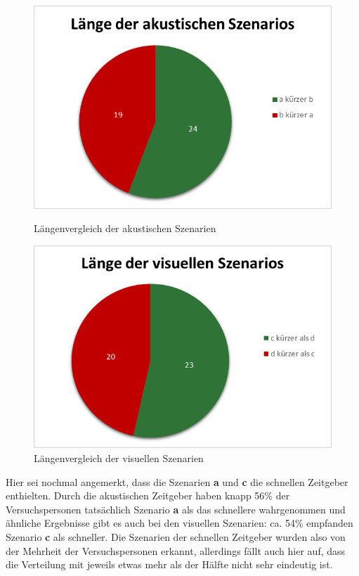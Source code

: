 \documentclass{Paper}
\begin{document}
\begin{figure}[H]
\begin{minipage}[t]{0.49\linewidth}
	\includegraphics[scale=0.7]{../Diagramme/einschaetzung/laenge_akustisch.png}
	\caption{Längenvergleich der akustischen Szenarien}
	\label{SzenarienAkustisch}
\end{minipage}
\hfill
\begin{minipage}[t]{0.49\linewidth}
	\includegraphics[scale=0.45]{../Diagramme/einschaetzung/laenge_visuell.png}
	\caption{Längenvergleich der visuellen Szenarien}
	\label{SzenarienVisuell}
\end{minipage}
\end{figure}

       
Hier sei nochmal angemerkt, dass die Szenarien \textbf{a} und \textbf{c} die schnellen Zeitgeber enthielten. Durch die akustischen Zeitgeber haben knapp 56\% der Versuchspersonen tatsächlich Szenario \textbf{a} als das schnellere wahrgenommen und ähnliche Ergebnisse gibt es auch bei den visuellen Szenarien: ca. 54\% empfanden Szenario \textbf{c} als schneller. 
Die Szenarien der schnellen Zeitgeber wurden also von der Mehrheit der Versuchspersonen erkannt, allerdings fällt auch hier auf, dass die Verteilung mit jeweils etwas mehr als der Hälfte nicht sehr eindeutig ist. 
      
\end{document}
